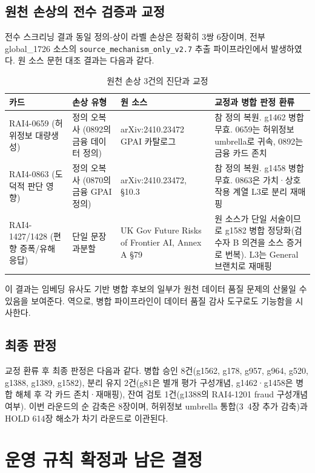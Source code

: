 \documentclass[11pt,a4paper]{article}
\begin{document}
\subsection{원천 손상의 전수 검증과 교정}

전수 스크리닝 결과 동일 정의-상이 라벨 손상은 정확히 3쌍 6장이며, 전부 global\_1726 소스의 \texttt{source\_mechanism\_only\_v2.7} 추출 파이프라인에서 발생하였다. 원 소스 문헌 대조 결과는 다음과 같다.

\begin{table}[htbp]
\centering
\small
\caption{원천 손상 3건의 진단과 교정}
\begin{tabular}{p{2.6cm}p{3.4cm}p{3.2cm}p{5.0cm}}
\toprule
카드 & 손상 유형 & 원 소스 & 교정과 병합 판정 환류 \\
\midrule
RAI4-0659 (허위정보 대량생성) & 정의 오복사 (0892의 금융 데이터 정의) & arXiv:2410.23472 GPAI 카탈로그 & 참 정의 복원. g1462 병합 무효. 0659는 허위정보 umbrella로 귀속, 0892는 금융 카드 존치 \\
RAI4-0863 (도덕적 판단 영향) & 정의 오복사 (0870의 금융 GPAI 정의) & arXiv:2410.23472, \S10.3 & 참 정의 복원. g1458 병합 무효. 0863은 가치·상호작용 계열 L3로 분리 재매핑 \\
RAI4-1427/1428 (편향 증폭/유해 응답) & 단일 문장 과분할 & UK Gov Future Risks of Frontier AI, Annex A \S79 & 원 소스가 단일 서술이므로 g1582 병합 정당화(검수자 B 의견을 소스 증거로 번복). L3는 General 브랜치로 재매핑 \\
\bottomrule
\end{tabular}
\end{table}

이 결과는 임베딩 유사도 기반 병합 후보의 일부가 원천 데이터 품질 문제의 산물일 수 있음을 보여준다. 역으로, 병합 파이프라인이 데이터 품질 감사 도구로도 기능함을 시사한다.

\subsection{최종 판정}

교정 환류 후 최종 판정은 다음과 같다. 병합 승인 8건(g1562, g178, g957, g964, g520, g1388, g1389, g1582), 분리 유지 2건(g81은 별개 평가 구성개념, g1462·g1458은 병합 해체 후 각 카드 존치·재매핑), 잔여 검토 1건(g1388의 RAI4-1201 fraud 구성개념 여부). 이번 라운드의 순 감축은 8장이며, 허위정보 umbrella 통합(3~4장 추가 감축)과 HOLD 614장 해소가 차기 라운드로 이관된다.

\section{운영 규칙 확정과 남은 결정}
\end{document}
